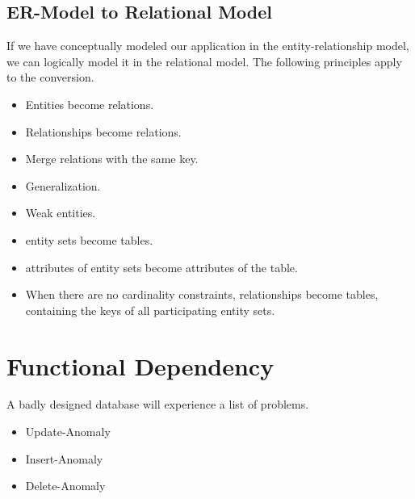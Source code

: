 \subsection{ER-Model to Relational Model}
If we have conceptually modeled our application in the entity-relationship model, we can logically model it in the relational model. The following principles apply to the conversion.
\begin{itemize}
\item Entities become relations.
\item Relationships become relations.
\item Merge relations with the same key.
\item Generalization.
\item Weak entities.
\item entity sets become tables.
\item attributes of entity sets become attributes of the table.
\item When there are no cardinality constraints, relationships become tables, containing the keys of all participating entity sets.
\end{itemize}

\section{Functional Dependency}
A badly designed database will experience a list of problems.
\begin{itemize}
\item Update-Anomaly
\item Insert-Anomaly
\item Delete-Anomaly
\end{itemize}

